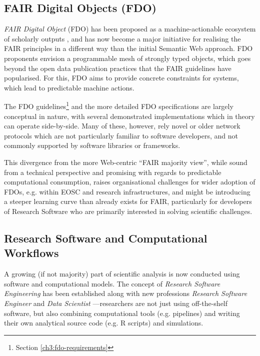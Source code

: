 \subsection{FAIR Digital Objects (FDO)}

\emph{FAIR Digital Object} (\acrshort{FDO}) has been proposed as a machine-actionable ecosystem of scholarly outputs \cite{Schultes 2019}, and has now become a major initiative for realising the \acrshort{FAIR} principles in a different way than the initial Semantic Web approach.
FDO proponents envision a programmable mesh of strongly typed objects, which goes beyond the open data publication practices that the FAIR guidelines have popularised.
For this, FDO aims to provide concrete constraints for systems, which lead to predictable machine actions.

The FDO guidelines\footnote{Section \vref{ch3:fdo-requirements}} \cite{Anders 2023} and the more detailed FDO specifications \cite{Ivonne 2023} are largely conceptual in nature, with several demonstrated implementations \cite{Wittenburg 2022a,Lannom 2022a} which in theory can operate side-by-side.
Many of these, however, rely novel or older network protocols \cite{Reilly 2009,Sun 2003a} which are not particularly familiar to software developers, and not commonly supported by software libraries or frameworks.

This divergence from the more Web-centric ``FAIR majority view'', while sound from a technical perspective and promising with regards to predictable computational consumption, raises organisational challenges for wider adoption of FDOs, e.g. within EOSC and research infrastructures, and might be introducing a steeper learning curve than already exists for FAIR, particularly for developers of Research Software who are primarily interested in solving scientific challenges. 



\subsection{Research Software and Computational Workflows}

A growing (if not majority) part of scientific analysis is now conducted using software and computational models.
The concept of \emph{Research Software Engineering} \cite{Cohen 2020} has been established along with new professions \emph{Research Software Engineer} \cite{Baxter 2012} and \emph{Data Scientist} \cite{van der Aalst 2014}---researchers are not just using off-the-shelf software, but also combining computational tools (e.g. pipelines) and writing their own analytical source code (e.g. R scripts) and simulations.

